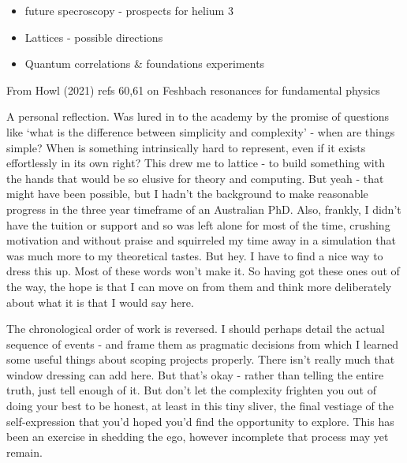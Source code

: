 \begin{itemize}
\item
  future specroscopy - prospects for helium 3
\item
  Lattices - possible directions
\item
  Quantum correlations \& foundations experiments
\end{itemize}

From Howl (2021) refs 60,61 on Feshbach resonances for fundamental physics

A personal reflection.
	Was lured in to the academy by the promise of
questions like `what is the difference between simplicity and
complexity' - when are things simple? When is something intrinsically
hard to represent, even if it exists effortlessly in its own right? This
drew me to lattice - to build something with the hands that would be so
elusive for theory and computing.
	But yeah - that might have been
possible, but I hadn't the background to make reasonable progress in the
three year timeframe of an Australian PhD.
	Also, frankly, I didn't have
the tuition or support and so was left alone for most of the time,
crushing motivation and without praise and squirreled my time away in a
simulation that was much more to my theoretical tastes.
	But hey.
	I have
to find a nice way to dress this up.
	Most of these words won't make it.
So having got these ones out of the way, the hope is that I can move on
from them and think more deliberately about what it is that I would say
here.

The chronological order of work is reversed.
	I should perhaps detail the
actual sequence of events - and frame them as pragmatic decisions from
which I learned some useful things about scoping projects properly.
There isn't really much that window dressing can add here.
	But that's
okay - rather than telling the entire truth, just tell enough of it.
	But
don't let the complexity frighten you out of doing your best to be
honest, at least in this tiny sliver, the final vestiage of the
self-expression that you'd hoped you'd find the opportunity to explore.
This has been an exercise in shedding the ego, however incomplete that
process may yet remain.

